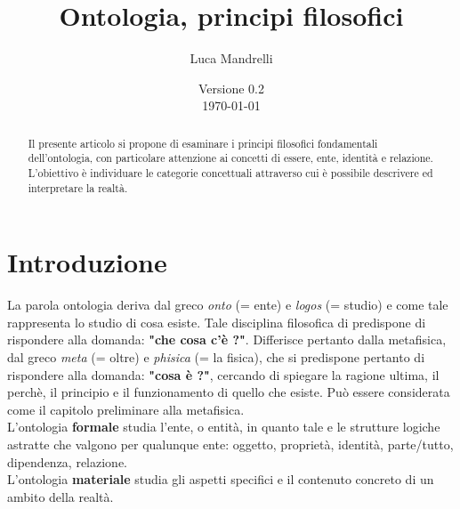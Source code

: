 \documentclass[a4paper,12pt]{article}
\title{Ontologia, principi filosofici}
\author{Luca Mandrelli}
\date{Versione 0.2 \\ \today}
\begin{document}
\maketitle

\begin{abstract}
Il presente articolo si propone di esaminare i principi
filosofici fondamentali dell'ontologia, con particolare
attenzione ai concetti di essere, ente, identità e relazione.
L'obiettivo è individuare le categorie concettuali attraverso
cui è possibile descrivere ed interpretare la realtà.
\end{abstract}

\newpage
\tableofcontents
\newpage

\section{Introduzione} %
La parola ontologia deriva dal greco \textit{onto} (= ente) e \textit{logos} (= studio) %
e come tale rappresenta lo studio di cosa esiste. Tale disciplina filosofica di predispone 
di rispondere alla domanda: \textbf{"che cosa c'è ?"}. Differisce pertanto dalla metafisica, 
dal greco \textit{meta} (= oltre) e \textit{phisica} (= la fisica),
che si predispone pertanto di rispondere alla domanda: \textbf{"cosa è ?"}, cercando di spiegare
la ragione ultima, il perchè, il principio e il funzionamento di quello che esiste.
Può essere considerata come il capitolo preliminare alla metafisica.
\\ L'ontologia \textbf{formale} studia l'ente, o entità, in quanto tale e le strutture logiche astratte
che valgono per qualunque ente: oggetto, proprietà, identità, parte/tutto, dipendenza, 
relazione. 
\\ L'ontologia \textbf{materiale} studia gli aspetti specifici e il contenuto concreto di un ambito
della realtà.
\end{document}
